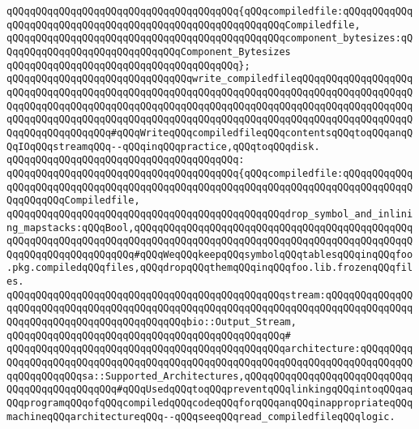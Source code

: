 \verb|qQQqqQQqqQQqqQQqqQQqqQQqqQQqqQQqqQQqqQQq{qQQqcompiledfile:qQQqqQQqqQQqqQQqqQQqqQQqqQQqqQQqqQQqqQQqqQQqqQQqqQQqqQQqqQQqCompiledfile,|\newline
\verb|qQQqqQQqqQQqqQQqqQQqqQQqqQQqqQQqqQQqqQQqqQQqqQQqcomponent_bytesizes:qQQqqQQqqQQqqQQqqQQqqQQqqQQqqQQqComponent_Bytesizes|\newline
\verb|qQQqqQQqqQQqqQQqqQQqqQQqqQQqqQQqqQQqqQQq};|\newline
\newline
\newline
\newline
\verb|qQQqqQQqqQQqqQQqqQQqqQQqqQQqqQQqwrite_compiledfileqQQqqQQqqQQqqQQqqQQqqQQqqQQqqQQqqQQqqQQqqQQqqQQqqQQqqQQqqQQqqQQqqQQqqQQqqQQqqQQqqQQqqQQqqQQqqQQqqQQqqQQqqQQqqQQqqQQqqQQqqQQqqQQqqQQqqQQqqQQqqQQqqQQqqQQqqQQqqQQqqQQqqQQqqQQqqQQqqQQqqQQqqQQqqQQqqQQqqQQqqQQqqQQqqQQqqQQqqQQqqQQqqQQqqQQqqQQqqQQqqQQqqQQq#qQQqWriteqQQqcompiledfileqQQqcontentsqQQqtoqQQqanqQQqIOqQQqstreamqQQq--qQQqinqQQqpractice,qQQqtoqQQqdisk.|\newline
\verb|qQQqqQQqqQQqqQQqqQQqqQQqqQQqqQQqqQQqqQQq:|\newline
\verb|qQQqqQQqqQQqqQQqqQQqqQQqqQQqqQQqqQQqqQQq{qQQqcompiledfile:qQQqqQQqqQQqqQQqqQQqqQQqqQQqqQQqqQQqqQQqqQQqqQQqqQQqqQQqqQQqqQQqqQQqqQQqqQQqqQQqqQQqqQQqqQQqCompiledfile,|\newline
\verb|qQQqqQQqqQQqqQQqqQQqqQQqqQQqqQQqqQQqqQQqqQQqqQQqdrop_symbol_and_inlining_mapstacks:qQQqBool,qQQqqQQqqQQqqQQqqQQqqQQqqQQqqQQqqQQqqQQqqQQqqQQqqQQqqQQqqQQqqQQqqQQqqQQqqQQqqQQqqQQqqQQqqQQqqQQqqQQqqQQqqQQqqQQqqQQqqQQqqQQqqQQqqQQqqQQqqQQq#qQQqWeqQQqkeepqQQqsymbolqQQqtablesqQQqinqQQqfoo.pkg.compiledqQQqfiles,qQQqdropqQQqthemqQQqinqQQqfoo.lib.frozenqQQqfiles.|\newline
\verb|qQQqqQQqqQQqqQQqqQQqqQQqqQQqqQQqqQQqqQQqqQQqqQQqstream:qQQqqQQqqQQqqQQqqQQqqQQqqQQqqQQqqQQqqQQqqQQqqQQqqQQqqQQqqQQqqQQqqQQqqQQqqQQqqQQqqQQqqQQqqQQqqQQqqQQqqQQqqQQqqQQqqQQqbio::Output_Stream,|\newline
\verb|qQQqqQQqqQQqqQQqqQQqqQQqqQQqqQQqqQQqqQQqqQQqqQQq#|\newline
\verb|qQQqqQQqqQQqqQQqqQQqqQQqqQQqqQQqqQQqqQQqqQQqqQQqarchitecture:qQQqqQQqqQQqqQQqqQQqqQQqqQQqqQQqqQQqqQQqqQQqqQQqqQQqqQQqqQQqqQQqqQQqqQQqqQQqqQQqqQQqqQQqqQQqsa::Supported_Architectures,qQQqqQQqqQQqqQQqqQQqqQQqqQQqqQQqqQQqqQQqqQQqqQQq#qQQqUsedqQQqtoqQQqpreventqQQqlinkingqQQqintoqQQqaqQQqprogramqQQqofqQQqcompiledqQQqcodeqQQqforqQQqanqQQqinappropriateqQQqmachineqQQqarchitectureqQQq--qQQqseeqQQqread_compiledfileqQQqlogic.|\newline
